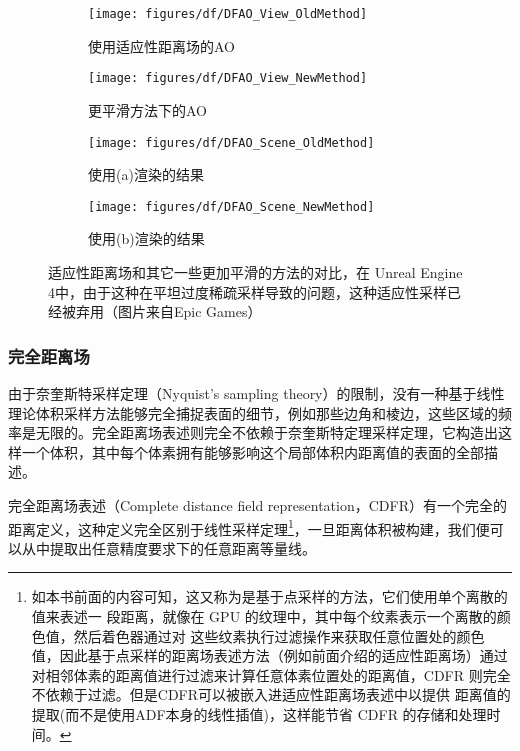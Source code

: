 \begin{figure}
\begin{fullwidth}
	\begin{subfigure}[b]{0.5\thewidth}
		\texttt{[image: figures/df/DFAO\_View\_OldMethod]}
		\caption{使用适应性距离场的AO}
	\end{subfigure}
	\begin{subfigure}[b]{0.5\thewidth}
		\texttt{[image: figures/df/DFAO\_View\_NewMethod]}
		\caption{更平滑方法下的AO}
	\end{subfigure}
	\begin{subfigure}[b]{0.5\thewidth}
		\texttt{[image: figures/df/DFAO\_Scene\_OldMethod]}
		\caption{使用(a)渲染的结果}
	\end{subfigure}
	\begin{subfigure}[b]{0.5\thewidth}
		\texttt{[image: figures/df/DFAO\_Scene\_NewMethod]}
		\caption{使用(b)渲染的结果}
	\end{subfigure}
	\caption{适应性距离场和其它一些更加平滑的方法的对比，在 Unreal Engine 4中，由于这种在平坦过度稀疏采样导致的问题，这种适应性采样已经被弃用（图片来自Epic Games）}
	\label{f:ue4-adf-problem}
\end{fullwidth}
\end{figure}




\subsubsection{完全距离场}
由于奈奎斯特采样定理（Nyquist’s sampling theory）的限制，没有一种基于线性理论体积采样方法能够完全捕捉表面的细节，例如那些边角和棱边，这些区域的频率是无限的。完全距离场表述则完全不依赖于奈奎斯特定理采样定理，它构造出这样一个体积，其中每个体素拥有能够影响这个局部体积内距离值的表面的全部描述。

完全距离场表述（Complete distance field representation，CDFR）\cite{a:A-Complete-Distance-Field-Representation}有一个完全的距离定义，这种定义完全区别于线性采样定理\footnote{如本书前面的内容可知，这又称为是基于点采样的方法，它们使用单个离散的值来表述一 段距离，就像在 GPU 的纹理中，其中每个纹素表示一个离散的颜色值，然后着色器通过对 这些纹素执行过滤操作来获取任意位置处的颜色值，因此基于点采样的距离场表述方法（例如前面介绍的适应性距离场）通过对相邻体素的距离值进行过滤来计算任意体素位置处的距离值，CDFR 则完全不依赖于过滤。但是CDFR可以被嵌入进适应性距离场表述中以提供 距离值的提取(而不是使用ADF本身的线性插值)，这样能节省 CDFR 的存储和处理时间。}，一旦距离体积被构建，我们便可以从中提取出任意精度要求下的任意距离等量线。

